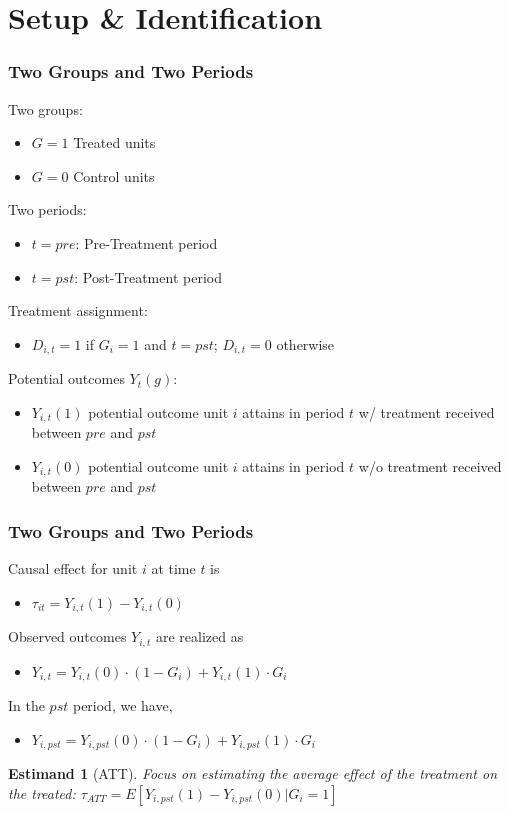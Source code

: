 \documentclass[xcolor=svgnames,9pt,english, aspectratio=169]{beamer}
\newtheorem{estm}{Estimand}
\begin{document}
\section{Setup \& Identification}


\begin{frame}
  \frametitle{Two Groups and Two Periods}
\begin{Definition}
Two groups:
\begin{itemize}
\item $G=1$ Treated units
\item $G=0$ Control units
\end{itemize}\medskip
Two periods:
\begin{itemize}
\item $t=pre$: Pre-Treatment period
\item $t=pst$: Post-Treatment period
\end{itemize}\medskip
Treatment assignment:
\begin{itemize}
\item $D_{i,t}=1$ if $G_{i} = 1$ and $t = pst$; $D_{i,t}=0$ otherwise
\end{itemize}\medskip
Potential outcomes $Y_{t}(g)$:
\begin{itemize}
\item $Y_{i,t}(1)$ potential outcome unit $i$ attains in period $t$ w/
treatment received between $pre$ and $pst$
\item $Y_{i,t}(0)$ potential outcome unit $i$ attains in period $t$ w/o treatment received between $pre$ and $pst$
\end{itemize}
\end{Definition}
\end{frame}

\begin{frame}
  \frametitle{Two Groups and Two Periods}
\begin{Definition}
Causal effect for unit $i$ at time $t$ is
\begin{itemize}
\item $\tau_{it}=Y_{i,t}(1)-Y_{i,t}(0)$
\end{itemize}\medskip
Observed outcomes $Y_{i,t}$ are realized as
\begin{itemize}
\item $Y_{i,t}=Y_{i,t}(0)\cdot (1-G_{i})+Y_{i,t}(1)\cdot G_{i}$
\end{itemize}\medskip
In the $pst$ period, we have,
\begin{itemize}
  \item  $Y_{i,pst}=Y_{i,pst}(0)\cdot (1-G_i)+Y_{i,pst}(1)\cdot G_i$
\end{itemize}
\end{Definition}
\begin{estm}[ATT]
Focus on estimating the average effect of the treatment on the treated:
$\tau_{ATT}= E[Y_{i,pst}(1)-Y_{i,pst}(0)|G_{i}=1]$
\end{estm}
\end{frame}
\end{document}
